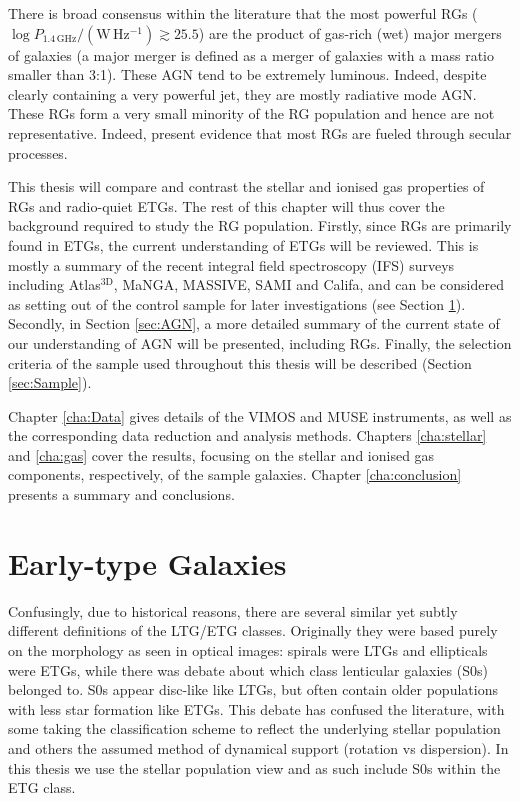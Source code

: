 	There is broad consensus within the literature that the most powerful RGs ($\log P_\mathrm{1.4\, GHz}/(\mathrm{W \, Hz^{-1}}) \gtrsim 25.5$) are the product of gas-rich (wet) major mergers of galaxies (a major merger is defined as a merger of galaxies with a mass ratio smaller than 3:1). These AGN tend to be extremely luminous. Indeed, despite clearly containing a very powerful jet, they are mostly radiative mode AGN. These RGs form a very small minority of the RG population and hence are not representative. Indeed, \citet{Heckman2014} present evidence that most RGs are fueled through secular processes.

	This thesis will compare and contrast the stellar and ionised gas properties of RGs and radio-quiet ETGs. The rest of this chapter will thus cover the background required to study the RG population. Firstly, since RGs are primarily found in ETGs, the current understanding of ETGs will be reviewed. This is mostly a summary of the recent integral field spectroscopy (IFS) surveys including Atlas$^\text{3D}$, MaNGA, MASSIVE, SAMI and Califa, and can be considered as setting out of the control sample for later investigations (see Section \ref{sec:ETG}). Secondly, in Section \ref{sec:AGN}, a more detailed summary of the current state of our understanding of AGN will be presented, including RGs. Finally, the selection criteria of the sample used throughout this thesis will be described (Section \ref{sec:Sample}).

	Chapter \ref{cha:Data} gives details of the VIMOS and MUSE instruments, as well as the corresponding data reduction and analysis methods. Chapters \ref{cha:stellar} and \ref{cha:gas} cover the results, focusing on the stellar and ionised gas components, respectively, of the sample galaxies. Chapter \ref{cha:conclusion} presents a summary and conclusions. 

\section{Early-type Galaxies}
	\label{sec:ETG}
	Confusingly, due to historical reasons, there are several similar yet subtly different definitions of the LTG/ETG classes. Originally they were based purely on the morphology as seen in optical images: spirals were LTGs and ellipticals were ETGs, while there was debate about which class lenticular galaxies (S0s) belonged to. S0s appear disc-like like LTGs, but often contain older populations with less star formation like ETGs. This debate has confused the literature, with some taking the classification scheme to reflect the underlying stellar population and others the assumed method of dynamical support (rotation vs dispersion). In this thesis we use the stellar population view and as such include S0s within the ETG class.

